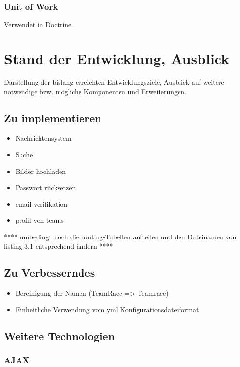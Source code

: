 \documentclass[12pt]{report}
\begin{document}
\subsection{Unit of Work}
Verwendet in Doctrine \cite{ab94} 




\chapter{Stand der Entwicklung, Ausblick}
Darstellung der bislang erreichten Entwicklungsziele, Ausblick auf weitere notwendige bzw. mögliche Komponenten und Erweiterungen.

\section{Zu implementieren}
\begin{itemize}
\item{Nachrichtensystem}
\item{Suche}
\item{Bilder hochladen}
\item{Passwort rücksetzen}
\item{email verifikation}
\item{profil von teams}
\end{itemize}

**** umbedingt noch die routing-Tabellen aufteilen und den Dateinamen von listing 3.1 entsprechend ändern ****


\section{Zu Verbesserndes}

\begin{itemize}
\item{Bereinigung der Namen (TeamRace => Teamrace)}
\item{Einheitliche Verwendung vom yml Konfigurationsdateiformat}
\end{itemize}

\section{Weitere Technologien}

\subsection{AJAX}
\label{sec:AJAX}




\end{document}
